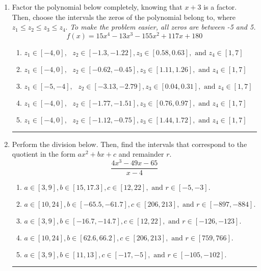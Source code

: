 \documentclass[14pt]{extbook}
\newcommand{\litem}[1]{\item#1\hspace*{-1cm}\rule{\textwidth}{0.4pt}}
\begin{document}
\begin{enumerate}
{\begin{enumerate}[label=\Alph*.]
\end{enumerate} }
\litem{
Factor the polynomial below completely, knowing that $x+3$ is a factor. Then, choose the intervals the zeros of the polynomial belong to, where $z_1 \leq z_2 \leq z_3 \leq z_4$. \textit{To make the problem easier, all zeros are between -5 and 5.}\[ f(x) = 15x^{4} -13 x^{3} -155 x^{2} +117 x + 180 \]\begin{enumerate}[label=\Alph*.]
\item \( z_1 \in [-4, 0], \text{   }  z_2 \in [-1.3, -1.22], z_3 \in [0.58, 0.63], \text{   and   } z_4 \in [1, 7] \)
\item \( z_1 \in [-4, 0], \text{   }  z_2 \in [-0.62, -0.45], z_3 \in [1.11, 1.26], \text{   and   } z_4 \in [1, 7] \)
\item \( z_1 \in [-5, -4], \text{   }  z_2 \in [-3.13, -2.79], z_3 \in [0.04, 0.31], \text{   and   } z_4 \in [1, 7] \)
\item \( z_1 \in [-4, 0], \text{   }  z_2 \in [-1.77, -1.51], z_3 \in [0.76, 0.97], \text{   and   } z_4 \in [1, 7] \)
\item \( z_1 \in [-4, 0], \text{   }  z_2 \in [-1.12, -0.75], z_3 \in [1.44, 1.72], \text{   and   } z_4 \in [1, 7] \)

\end{enumerate} }
\litem{
Perform the division below. Then, find the intervals that correspond to the quotient in the form $ax^2+bx+c$ and remainder $r$.\[ \frac{4x^{3} -49 x -65}{x -4} \]\begin{enumerate}[label=\Alph*.]
\item \( a \in [3, 9], b \in [15, 17.3], c \in [12, 22], \text{ and } r \in [-5, -3]. \)
\item \( a \in [10, 24], b \in [-65.5, -61.7], c \in [206, 213], \text{ and } r \in [-897, -884]. \)
\item \( a \in [3, 9], b \in [-16.7, -14.7], c \in [12, 22], \text{ and } r \in [-126, -123]. \)
\item \( a \in [10, 24], b \in [62.6, 66.2], c \in [206, 213], \text{ and } r \in [759, 766]. \)
\item \( a \in [3, 9], b \in [11, 13], c \in [-17, -5], \text{ and } r \in [-105, -102]. \)

\end{enumerate} }
\end{enumerate}
\end{document}
